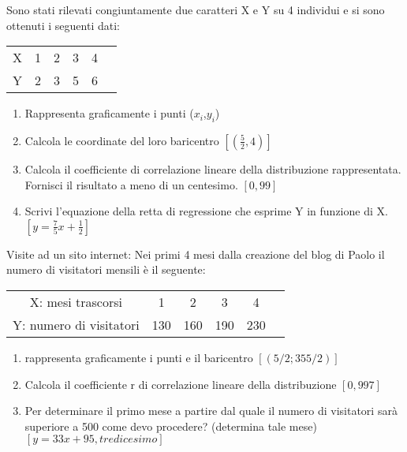\begin{esercizio}
\label{ese:c_stat_007}
Sono stati rilevati congiuntamente due caratteri X e Y su 4 
individui e si sono ottenuti i seguenti dati:
\begin{center}
\begin{tabular}{cccccc}
\toprule 
X& 1& 2& 3& 4\\
Y& 2& 3& 5& 6\\
\bottomrule 
\end{tabular}
\end{center}
\begin{enumerate}
\item Rappresenta graficamente i punti ($x_i$,$y_i$)
\item Calcola le coordinate del loro baricentro \hfill 
$[(\frac{5}{2},4)]$
\item Calcola il coefficiente di correlazione lineare della 
distribuzione rappresentata. Fornisci il risultato a meno di un centesimo. 
\hfill $[0,99]$
\item Scrivi l'equazione della retta di regressione che 
esprime Y in funzione di X. \hfill $[y=\frac{7}{5}x+\frac{1}{2}]$
\end{enumerate}
\end{esercizio}

\begin{esercizio}
\label{ese:c_stat_008}
Visite ad un sito internet: Nei primi 4 mesi dalla creazione del blog 
di Paolo il numero di visitatori mensili è il seguente:

\begin{center}
\begin{tabular}{cccccc}
\toprule
X: mesi trascorsi & 1 & 2 & 3 & 4\\
Y: numero di visitatori & 130 & 160 & 190 & 230\\
\bottomrule 
\end{tabular}
\end{center}

\begin{enumerate}
\item rappresenta graficamente i punti e il baricentro \hfill 
$[(5/2; 355/2)]$
\item Calcola il coefficiente r di correlazione lineare della 
distribuzione \hfill $[0,997]$
\item Per determinare il primo mese a partire dal quale il numero 
di visitatori sarà superiore a 500 come devo procedere? (determina tale 
mese) \hfill $[y=33x+95, tredicesimo]$
\end{enumerate}
\end{esercizio}

